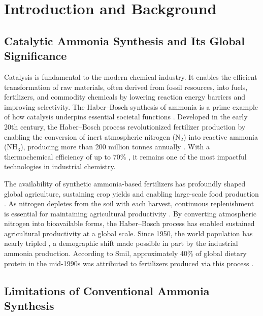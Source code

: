 
\chapter{Introduction and Background}

\section{Catalytic Ammonia Synthesis and Its Global Significance}
Catalysis is fundamental to the modern chemical industry. It enables the efficient transformation of raw materials, often derived from fossil resources, into fuels, fertilizers, and commodity chemicals by lowering reaction energy barriers and improving selectivity. The Haber–Bosch synthesis of ammonia is a prime example of how catalysis underpins essential societal functions \cite{Nrskov2016SustainableProduction, Comer2019ProspectsFertilizers, Schloegl2003CatalyticStory}. Developed in the early 20th century, the Haber–Bosch process revolutionized fertilizer production by enabling the conversion of inert atmospheric nitrogen (N$_2$) into reactive ammonia (NH$_3$), producing more than 200 million tonnes annually \cite{MitchellCrow2023AAmmonia, Iriawan_2021}. With a thermochemical efficiency of up to 70\% \cite{Schiffer2017ElectrificationIndustry}, it remains one of the most impactful technologies in industrial chemistry.

The availability of synthetic ammonia-based fertilizers has profoundly shaped global agriculture, sustaining crop yields and enabling large-scale food production \cite{Pinker2018EnlightenmentProgress, Smil1999DetonatorExplosion, Smil2004EnrichingProduction}. As nitrogen depletes from the soil with each harvest, continuous replenishment is essential for maintaining agricultural productivity \cite{Qing2020RecentAmmonia}. By converting atmospheric nitrogen into bioavailable forms, the Haber–Bosch process has enabled sustained agricultural productivity at a global scale. Since 1950, the world population has nearly tripled \cite{UnitedNations2024WorldResults}, a demographic shift made possible in part by the industrial ammonia production. According to Smil, approximately 40\% of global dietary protein in the mid-1990s was attributed to fertilizers produced via this process \cite{Smil2004EnrichingProduction, Gao2023GreenhouseInterventions}.

\section{Limitations of Conventional Ammonia Synthesis}

